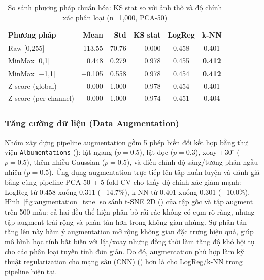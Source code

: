 \begin{table}[H]
    \centering
    \begin{tabular}{|l|r|r|r|c|c|}
        \hline
        \textbf{Phương pháp}  & \textbf{Mean} & \textbf{Std} & \textbf{KS stat} & \textbf{LogReg} & \textbf{k-NN}  \\
        \hline
        Raw [0,255]           & 113.55        & 70.76        & 0.000            & 0.458           & 0.401          \\
        \hline
        MinMax [0,1]          & 0.448         & 0.279        & 0.978            & 0.455           & \textbf{0.412} \\
        \hline
        MinMax [$-$1,1]       & $-$0.105      & 0.558        & 0.978            & 0.454           & \textbf{0.412} \\
        \hline
        Z-score (global)      & 0.000         & 1.000        & 0.978            & 0.454           & 0.401          \\
        \hline
        Z-score (per-channel) & 0.000         & 1.000        & 0.974            & 0.451           & 0.404          \\
        \hline
    \end{tabular}
    \caption{So sánh phương pháp chuẩn hóa: KS stat so với ảnh thô và độ chính xác phân loại (n=1{,}000, PCA-50)}
    \label{tab:normalization_ablation}
\end{table}

\subsubsection{Tăng cường dữ liệu (Data Augmentation)}

Nhóm xây dựng pipeline augmentation gồm 5 phép biến đổi kết hợp bằng thư viện \texttt{Albumentations} (\cite{buslaev2020albumentations}): lật ngang ($p=0.5$), lật dọc ($p=0.3$), xoay $\pm 30^\circ$ ($p=0.5$), thêm nhiễu Gaussian ($p=0.5$), và điều chỉnh độ sáng/tương phản ngẫu nhiên ($p=0.5$). Ứng dụng augmentation trực tiếp lên tập huấn luyện và đánh giá bằng cùng pipeline PCA-50 + 5-fold CV cho thấy độ chính xác giảm mạnh: LogReg từ 0.458 xuống 0.311 ($-$14.7\%), k-NN từ 0.401 xuống 0.301 ($-$10.0\%). Hình~\ref{fig:augmentation_tsne} so sánh t-SNE 2D (\cite{vandermaaten2008tsne}) của tập gốc và tập augment trên 500 mẫu: cả hai đều thể hiện phân bố rải rác không có cụm rõ ràng, nhưng tập augment trải rộng và phân tán hơn trong không gian nhúng. Sự phân tán tăng lên này hàm ý augmentation mở rộng không gian đặc trưng hiệu quả, giúp mô hình học tính bất biến với lật/xoay nhưng đồng thời làm tăng độ khó hội tụ cho các phân loại tuyến tính đơn giản. Do đó, augmentation phù hợp làm kỹ thuật regularization cho mạng sâu (CNN) (\cite{lecun1998gradient}) hơn là cho LogReg/k-NN trong pipeline hiện tại.


